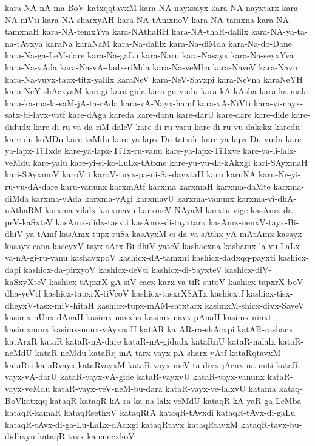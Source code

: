 {kara-NA-nA-ma-BoV-katxqqtavxM
kara-NA-nayxsayx
kara-NA-nayxtarx
kara-NA-niVti
kara-NA-sharxyAH
kara-NA-tAmxnoV
kara-NA-tamxna
kara-NA-tamxnaH
kara-NA-temxYva
kara-NAthaRH
kara-NA-thaR-dalilx
kara-NA-ya-ta-na-tAvxya
karaNa
karaNaM
kara-Na-dalilx
kara-Na-diMda
kara-Na-do-Dane
kara-Na-ga-LeM-dare
kara-Na-gaLu
kara-Naru
kara-Nasayx
kara-Na-seyxYva
kara-Na-vAda
kara-Na-vA-dadx-riMda
kara-Na-veMba
kara-NaveV
kara-Navu
kara-Na-vuyx-tapx-titx-yalilx
karaNeV
kara-NeV-Savxpi
kara-NeVna
karaNeYH
kara-NeY-shAcxyaM
karagi
kara-gida
kara-gu-vudu
kara-kA-kAsha
kara-ka-mala
kara-ka-ma-la-saM-jA-ta-rAda
kara-vA-Nayx-hamf
kara-vA-NiVti
kara-vi-nayx-satx-bi-lavx-vatf
kare-dAga
kareda
kare-danu
kare-darU
kare-dare
kare-dide
kare-didudx
kare-di-ru-va-da-riM-daleV
kare-di-ru-varu
kare-di-ru-vu-dakekx
karedu
kare-du-koMDu
kare-taMdu
kare-ya-lapx-Du-tatxde
kare-ya-lapx-Du-vudu
kare-ya-lapx-TiTxde
kare-ya-lapx-TiTx-ru-vanu
kare-ya-lapx-TiTxve
kare-ya-li-lalx-veMdu
kare-yalu
kare-yi-si-ko-LuLx-tAtxne
kare-yu-vu-da-kAkxgi
kari-SAyxmaH
kari-SAyxmoV
karoVti
karoV-tuyx-pa-ni-Sa-dayxtaH
karu
karuNA
karu-Ne-yi-ru-vu-dA-dare
karu-vanunx
karxmAtf
karxma
karxmaH
karxma-daMte
karxma-diMda
karxma-vAda
karxma-vAgi
karxmavU
karxma-vanunx
karxma-vi-dhA-nAthaRM
karxma-vilalx
karxmavu
karxmeV-NAyaM
karxtu-vige
kasAmx-da-peV-kaSxteV
kasAmx-didx-tasxti
kasAmx-di-tayxtarx
kasAmx-nenxV-tayx-Bi-dhiV-ya-tAmf
kasAmx-tupx-ruSa
kasAyxM-ci-da-va-sAthx-yA-mAtAmx
kasayx
kasayx-cana
kaseyxV-tayx-tArx-Bi-dhiV-yateV
kashacxna
kashamx-la-vu-LaLx-va-nA-gi-ru-vanu
kashayxpoV
kashicx-dA-tamxni
kashicx-dadxqq-payxti
kashicx-dapi
kashicx-da-pirxyoV
kashicx-deVti
kashicx-di-SayxteV
kashicx-diV-kaSxyXteV
kashicx-tApxrX-gA-siV-cacx-karx-va-tiR-sutoV
kashicx-tapxrX-boV-dha-yeVtf
kashicx-tapxrX-tiVcoV
kashicx-tasxrXSATx
kashicxtf
kashicx-tisx-dheyxV-tasx-miV-hitaH
kashicx-tupx-mAM-satxtarx
kasimxM-shicx-divx-SayeV
kasimx-nUnx-dAnaH
kasimx-navxha
kasimx-navx-pAnaH
kasimx-ninxti
kasimxnunx
kasimx-nunx-vAyxnaH
katAR
katAR-ra-shAcxpi
katAR-rashacx
katArxR
kataR
kataR-nA-dare
kataR-nA-gidudx
kataRnU
kataR-nalalx
kataR-neMdU
kataR-neMdu
kataRq-mA-tarx-vayx-pA-sharx-yAtf
kataRqtavxM
kataRri
kataRvayx
kataRvayxM
kataR-vayx-meV-ta-divx-jAcnx-na-miti
kataR-vayx-vA-darU
kataR-vayx-vA-gide
kataR-vayxvU
kataR-vayx-vanunx
kataR-vayx-veMdu
kataR-vayx-veV-neM-bu-dara
kataR-vayx-ve-lalxvU
katama
kataq-BoVkatxqq
kataqR
kataqR-kA-ra-ka-na-lalx-veMdU
kataqR-kA-yaR-ga-LeMba
kataqR-kamaR
kataqRsethxV
kataqRtA
kataqR-tAvxdi
kataqR-tAvx-di-gaLu
kataqR-tAvx-di-ga-Lu-LaLx-dAdxgi
kataqRtavx
kataqRtavxM
kataqR-tavx-bu-didhxyu
kataqR-tavx-ka-cnucxkoV
}
